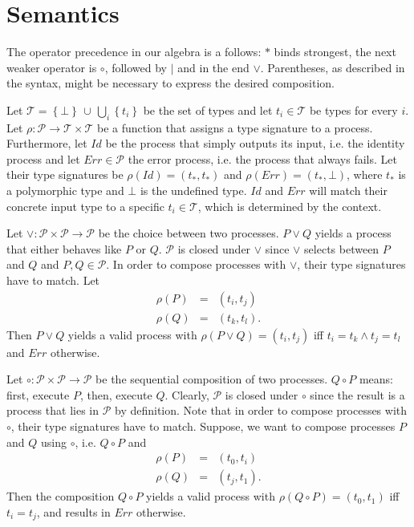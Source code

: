 \section{Semantics}
The operator precedence in our algebra is a follows: $*$ binds strongest, the next weaker operator is $\circ$, followed by $|$ and in the end $\vee$. Parentheses, as described in the syntax, might be necessary to express the desired composition.

Let $\mathcal{T} = \left\{ \bot \right\} \, \cup \, \bigcup_i \left\{ t_i \right\}$ be the set of types and let $t_i \in \mathcal{T}$ be types for every $i$. Let $\rho \colon \mathcal{P} \to \mathcal{T} \times \mathcal{T}$ be a function that assigns a type signature to a process. Furthermore, let $Id$ be the process that simply outputs its input, i.e. the identity process and let $Err \in \mathcal{P}$ the error process, i.e. the process that always fails. Let their type signatures be $\rho \left( Id \right) = \left( t_*, t_* \right)$ and $\rho \left( Err \right) = \left( t_*, \bot \right)$, where $t_*$ is a polymorphic type and $\bot$ is the undefined type. $Id$ and $Err$ will match their concrete input type to a specific $t_i \in \mathcal{T}$, which is determined by the context.

Let $\vee \colon \mathcal{P} \times \mathcal{P} \to \mathcal{P}$ be the choice between two processes. $P \vee Q$ yields a process that either behaves like $P$ or $Q$. $\mathcal{P}$ is closed under $\vee$ since $\vee$ selects between $P$ and $Q$ and $P, Q \in \mathcal{P}$. In order to compose processes with $\vee$, their type signatures have to match. Let
\begin{eqnarray*}
  \rho \left( P \right) & = & \left( t_i, t_j \right) \\
  \rho \left( Q \right) & = & \left( t_k, t_l \right).
\end{eqnarray*}
Then $P \vee Q$ yields a valid process with $\rho \left( P \vee Q \right) = \left( t_i, t_j \right)$ iff $t_i = t_k \wedge t_j = t_l$ and $Err$ otherwise.

Let $\circ \colon \mathcal{P} \times \mathcal{P} \to \mathcal{P}$ be the sequential composition of two processes. $Q \circ P$ means: first, execute $P$, then, execute $Q$. Clearly, $\mathcal{P}$ is closed under $\circ$ since the result is a process that lies in $\mathcal{P}$ by definition. Note that in order to compose processes with $\circ$, their type signatures have to match. Suppose, we want to compose processes $P$ and $Q$ using $\circ$, i.e. $Q \circ P$ and
\begin{eqnarray*}
  \rho \left( P \right) & = & \left( t_0, t_i \right) \\
  \rho \left( Q \right) & = & \left( t_j, t_1 \right).
\end{eqnarray*}
Then the composition $Q \circ P$ yields a valid process with $\rho \left( Q \circ P \right) = \left( t_0, t_1 \right)$ iff $t_i = t_j$, and results in $Err$ otherwise. 

